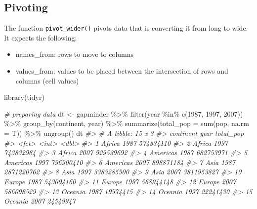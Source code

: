 \documentclass[
]{book}
\newenvironment{Shaded}{\begin{snugshade}}{\end{snugshade}}
\newcommand{\AttributeTok}[1]{\textcolor[rgb]{0.77,0.63,0.00}{#1}}
\newcommand{\CommentTok}[1]{\textcolor[rgb]{0.56,0.35,0.01}{\textit{#1}}}
\newcommand{\DecValTok}[1]{\textcolor[rgb]{0.00,0.00,0.81}{#1}}
\newcommand{\FunctionTok}[1]{\textcolor[rgb]{0.00,0.00,0.00}{#1}}
\newcommand{\NormalTok}[1]{#1}
\newcommand{\OtherTok}[1]{\textcolor[rgb]{0.56,0.35,0.01}{#1}}
\newcommand{\SpecialCharTok}[1]{\textcolor[rgb]{0.00,0.00,0.00}{#1}}
\providecommand{\tightlist}{%
  \setlength{\itemsep}{0pt}\setlength{\parskip}{0pt}}
\begin{document}
\hypertarget{pivoting-1}{%
\subsection{Pivoting}\label{pivoting-1}}

The function \texttt{pivot\_wider()} pivots data that is converting it from long to wide. It expects the following:

\begin{itemize}
\tightlist
\item
  names\_from: rows to move to columns
\item
  values\_from: values to be placed between the intersection of rows and columns (cell values)
\end{itemize}

\begin{Shaded}
\begin{Highlighting}[]
\FunctionTok{library}\NormalTok{(tidyr)}

\CommentTok{\# preparing data}
\NormalTok{dt }\OtherTok{\textless{}{-}}
\NormalTok{gapminder }\SpecialCharTok{\%\textgreater{}\%}
  \FunctionTok{filter}\NormalTok{(year }\SpecialCharTok{\%in\%} \FunctionTok{c}\NormalTok{(}\DecValTok{1987}\NormalTok{, }\DecValTok{1997}\NormalTok{, }\DecValTok{2007}\NormalTok{)) }\SpecialCharTok{\%\textgreater{}\%}
  \FunctionTok{group\_by}\NormalTok{(continent, year) }\SpecialCharTok{\%\textgreater{}\%}
  \FunctionTok{summarize}\NormalTok{(}\AttributeTok{total\_pop =} \FunctionTok{sum}\NormalTok{(pop, }\AttributeTok{na.rm =}\NormalTok{ T)) }\SpecialCharTok{\%\textgreater{}\%}
  \FunctionTok{ungroup}\NormalTok{()}
\NormalTok{dt}
\CommentTok{\#\textgreater{} \# A tibble: 15 x 3}
\CommentTok{\#\textgreater{}    continent  year  total\_pop}
\CommentTok{\#\textgreater{}    \textless{}fct\textgreater{}     \textless{}int\textgreater{}      \textless{}dbl\textgreater{}}
\CommentTok{\#\textgreater{}  1 Africa     1987  574834110}
\CommentTok{\#\textgreater{}  2 Africa     1997  743832984}
\CommentTok{\#\textgreater{}  3 Africa     2007  929539692}
\CommentTok{\#\textgreater{}  4 Americas   1987  682753971}
\CommentTok{\#\textgreater{}  5 Americas   1997  796900410}
\CommentTok{\#\textgreater{}  6 Americas   2007  898871184}
\CommentTok{\#\textgreater{}  7 Asia       1987 2871220762}
\CommentTok{\#\textgreater{}  8 Asia       1997 3383285500}
\CommentTok{\#\textgreater{}  9 Asia       2007 3811953827}
\CommentTok{\#\textgreater{} 10 Europe     1987  543094160}
\CommentTok{\#\textgreater{} 11 Europe     1997  568944148}
\CommentTok{\#\textgreater{} 12 Europe     2007  586098529}
\CommentTok{\#\textgreater{} 13 Oceania    1987   19574415}
\CommentTok{\#\textgreater{} 14 Oceania    1997   22241430}
\CommentTok{\#\textgreater{} 15 Oceania    2007   24549947}


\end{Highlighting}
\end{Shaded}
\end{document}
